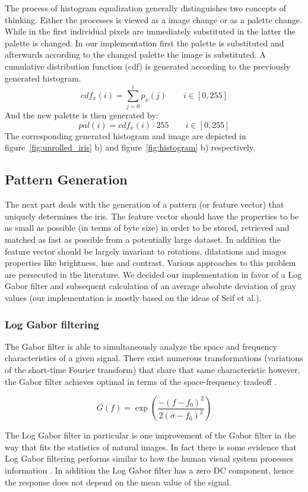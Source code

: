 \documentclass[journal]{IEEEtran}
\begin{document}
The process of histogram equalization generally distinguishes two concepts of thinking. Either the processes is viewed as a image change or as a palette change. While in the first individual pixels are immediately substituted in the latter the palette is changed. In our implementation first the palette is substituted and afterwards according to the changed palette the image is substituted.
A cumulative distribution function (cdf) is generated according to the previously generated histogram.
\[
	cdf_x(i) = \sum \limits_{j=0}^{i} p_x(j) \qquad i \in [0, 255]
\]
And the new palette is then generated by:
\[
	pal(i) = cdf_x(i) \cdot 255  \qquad i \in [0, 255]
\]
The corresponding generated histogram and image are depicted in figure~\ref{fig:unrolled_iris} b) and figure~\ref{fig:histogram} b) respectively.
\subsection{Pattern Generation}
The next part deals with the generation of a pattern (or feature vector) that uniquely determines the iris. The feature vector should have the properties to be as small as possible (in terms of byte size) in order to be stored, retrieved and matched as fast as possible from a potentially large dataset. In addition the feature vector should be largely invariant to rotations, dilatations and images properties like brightness, hue and contrast. Various approaches to this problem are persecuted in the literature. We decided our implementation in favor of a Log Gabor filter and subsequent calculation of an average absolute deviation of gray values (our implementation is mostly based on the ideas of Seif et al.\cite{seif2003iris}). 
\subsubsection{Log Gabor filtering}
The Gabor filter is able to simultaneously analyze the space and frequency characteristics of a given signal. There exist numerous transformations (variations of the short-time Fourier transform) that share that same characteristic however, the Gabor filter achieves optimal in terms of the space-frequency tradeoff \cite{gabor1946theory}.

\[
	G(f) = \exp\left( \frac{-(f-f_0)^2}{2(\sigma-f_0)^2}\right)
\]

The Log Gabor filter in particular is one improvement of the Gabor filter in the way that fits the statistics of natural images. In fact there is some evidence that Log Gabor filtering performs similar to how the human visual system processes information \cite{daugman1985uncertainty}. In addition the Log Gabor filter has a zero DC component, hence the response does not depend on the mean value of the signal.
\end{document}
